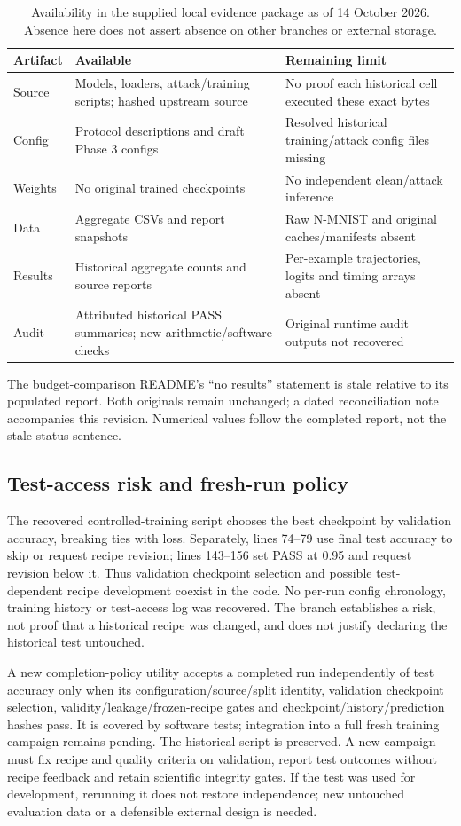 \begin{table}[H]\centering\small
\caption{Availability in the supplied local evidence package as of 14 October 2026. Absence here does not assert absence on other branches or external storage.}
\begin{tabularx}{\linewidth}{l L L}\toprule
Artifact & Available & Remaining limit\\\midrule
Source & Models, loaders, attack/training scripts; hashed upstream source & No proof each historical cell executed these exact bytes\\
Config & Protocol descriptions and draft Phase 3 configs & Resolved historical training/attack config files missing\\
Weights & No original trained checkpoints & No independent clean/attack inference\\
Data & Aggregate CSVs and report snapshots & Raw N-MNIST and original caches/manifests absent\\
Results & Historical aggregate counts and source reports & Per-example trajectories, logits and timing arrays absent\\
Audit & Attributed historical PASS summaries; new arithmetic/software checks & Original runtime audit outputs not recovered\\\bottomrule
\end{tabularx}
\end{table}
The budget-comparison README's ``no results'' statement is stale relative to its populated report. Both originals remain unchanged; a dated reconciliation note accompanies this revision. Numerical values follow the completed report, not the stale status sentence.

\subsection{Test-access risk and fresh-run policy}
The recovered controlled-training script chooses the best checkpoint by validation accuracy, breaking ties with loss. Separately, lines 74--79 use final test accuracy to skip or request recipe revision; lines 143--156 set PASS at 0.95 and request revision below it. Thus validation checkpoint selection and possible test-dependent recipe development coexist in the code. No per-run config chronology, training history or test-access log was recovered. The branch establishes a risk, not proof that a historical recipe was changed, and does not justify declaring the historical test untouched.

A new completion-policy utility accepts a completed run independently of test accuracy only when its configuration/source/split identity, validation checkpoint selection, validity/leakage/frozen-recipe gates and checkpoint/history/prediction hashes pass. It is covered by software tests; integration into a full fresh training campaign remains pending. The historical script is preserved. A new campaign must fix recipe and quality criteria on validation, report test outcomes without recipe feedback and retain scientific integrity gates. If the test was used for development, rerunning it does not restore independence; new untouched evaluation data or a defensible external design is needed.

